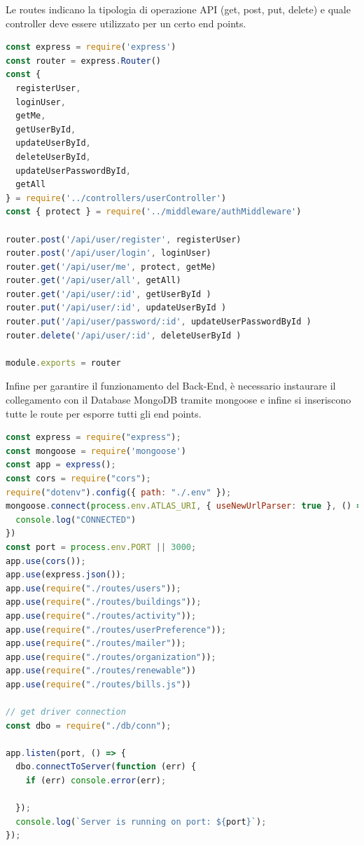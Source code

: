 \documentclass{report}
\begin{document}
\par Le routes indicano la tipologia di operazione API (get, post, put, delete) e quale controller deve essere utilizzato per un certo end points. 
\begin{lstlisting}[language=JavaScript]
const express = require('express')
const router = express.Router()
const {
  registerUser,
  loginUser,
  getMe,
  getUserById,
  updateUserById,
  deleteUserById,
  updateUserPasswordById,
  getAll
} = require('../controllers/userController')
const { protect } = require('../middleware/authMiddleware')

router.post('/api/user/register', registerUser)
router.post('/api/user/login', loginUser)
router.get('/api/user/me', protect, getMe)
router.get('/api/user/all', getAll)
router.get('/api/user/:id', getUserById )
router.put('/api/user/:id', updateUserById )
router.put('/api/user/password/:id', updateUserPasswordById )
router.delete('/api/user/:id', deleteUserById )

module.exports = router
\end{lstlisting}
\par Infine per garantire il funzionamento del Back-End, è necessario instaurare il collegamento con il Database MongoDB tramite mongoose e infine si inseriscono tutte le route per esporre tutti gli end points.
\begin{lstlisting}[language=JavaScript]
const express = require("express");
const mongoose = require('mongoose')
const app = express();
const cors = require("cors");
require("dotenv").config({ path: "./.env" });
mongoose.connect(process.env.ATLAS_URI, { useNewUrlParser: true }, () => {
  console.log("CONNECTED")
})
const port = process.env.PORT || 3000;
app.use(cors());
app.use(express.json());
app.use(require("./routes/users"));
app.use(require("./routes/buildings"));
app.use(require("./routes/activity"));
app.use(require("./routes/userPreference"));
app.use(require("./routes/mailer"));
app.use(require("./routes/organization"));
app.use(require("./routes/renewable"))
app.use(require("./routes/bills.js"))

// get driver connection
const dbo = require("./db/conn");

app.listen(port, () => {
  dbo.connectToServer(function (err) {
    if (err) console.error(err);

  });
  console.log(`Server is running on port: ${port}`);
});
\end{lstlisting}
\end{document}
